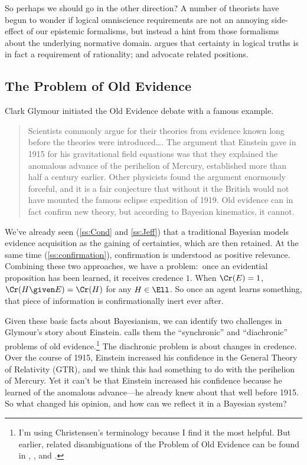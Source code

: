 So perhaps we should go in the other direction? A number of theorists have begun to wonder if logical omniscience requirements are not an annoying side-effect of our epistemic formalisms, but instead a hint from those formalisms about the underlying normative domain. \citet{SmithiesIdeal} argues that certainty in logical truths is in fact a requirement of rationality; \citet{TitelbaumRight} and \citet{LittlejohnSense} advocate related positions.


\subsection{The Problem of Old Evidence}
Clark Glymour initiated the Old Evidence debate with a famous example.
\begin{quote}
Scientists commonly argue for their theories from evidence known long before the theories were introduced\ldots. The argument that Einstein gave in 1915 for his gravitational field equations was that they explained the anomalous advance of the perihelion of Mercury, established more than half a century earlier. Other physicists found the argument enormously forceful, and it is a fair conjecture that without it the British would not have mounted the famous eclipse expedition of 1919. Old evidence can in fact confirm new theory, but according to Bayesian kinematics, it cannot. \citep[pp.\ 306--7]{GlymourTheory}
\end{quote}
We've already seen (\autoref{ss:Cond} and \ref{ss:Jeff}) that a traditional Bayesian models evidence acquisition as the gaining of certainties, which are then retained. At the same time (\autoref{ss:confirmation}), confirmation is understood as positive relevance. Combining these two approaches, we have a problem:\ once an evidential proposition has been learned, it receives credence $1$. When $\Cr(E)=1$, $\Cr(H \given E)=\Cr(H)$ for any $H \in \Ell$. So once an agent learns something, that piece of information is confirmationally inert ever after.

Given these basic facts about Bayesianism, we can identify two challenges in Glymour's story about Einstein. \citet{ChristensenMeasuring} calls them the ``synchronic'' and ``diachronic'' problems of old evidence.\footnote
{I'm using Christensen's terminology because I find it the most helpful. But earlier, related disambiguations of the Problem of Old Evidence can be found in \citet{Garber}, \citet{EellsOldEvidence}, and \citet{ZyndaOld}.}
The diachronic problem is about changes in credence. Over the course of 1915, Einstein increased his confidence in the General Theory of Relativity (GTR), and we think this had something to do with the perihelion of Mercury. Yet it can't be that Einstein increased his confidence because he learned of the anomalous advance---he already knew about that well before 1915. So what changed his opinion, and how can we reflect it in a Bayesian system?

